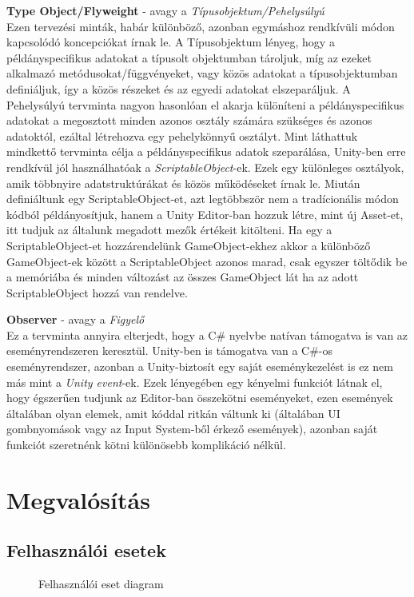 \textbf{Type Object/Flyweight} - avagy a \textit{Típusobjektum/Pehelysúlyú}\\
Ezen tervezési minták, habár különböző, azonban egymáshoz rendkívüli módon kapcsolódó koncepciókat írnak le. A Típusobjektum lényeg, hogy a példányspecifikus adatokat a típusolt objektumban tároljuk, míg az ezeket alkalmazó metódusokat/függvényeket, vagy közös adatokat a típusobjektumban definiáljuk, így a közös részeket és az egyedi adatokat elszeparáljuk. A Pehelysúlyú tervminta nagyon hasonlóan el akarja különíteni a példányspecifikus adatokat a megosztott minden azonos osztály számára szükséges és azonos adatoktól, ezáltal létrehozva egy pehelykönnyű osztályt. Mint láthattuk mindkettő tervminta célja a példányspecifikus adatok szeparálása, Unity-ben erre rendkívül jól használhatóak a \textit{ScriptableObject}-ek. Ezek egy különleges osztályok, amik többnyire adatstruktúrákat és közös működéseket írnak le. Miután definiáltunk egy ScriptableObject-et, azt legtöbbször nem a tradícionális módon kódból példányosítjuk, hanem a Unity Editor-ban hozzuk létre, mint új Asset-et, itt tudjuk az általunk megadott mezők értékeit kitölteni. Ha egy a ScriptableObject-et hozzárendelünk GameObject-ekhez akkor a különböző GameObject-ek között a ScriptableObject azonos marad, csak egyszer töltődik be a memóriába és minden változást az összes GameObject lát ha az adott ScriptableObject hozzá van rendelve.

\textbf{Observer} - avagy a \textit{Figyelő}\\
Ez a tervminta annyira elterjedt, hogy a C\# nyelvbe natívan támogatva is van az eseményrendszeren keresztül. Unity-ben is támogatva van a C\#-os eseményrendszer, azonban a Unity-biztosít egy saját eseménykezelést is ez nem más mint a \textit{Unity event}-ek. Ezek lényegében egy kényelmi funkciót látnak el, hogy égszerűen tudjunk az Editor-ban összekötni eseményeket, ezen események általában olyan elemek, amit kóddal ritkán váltunk ki (általában UI gombnyomások vagy az Input System-ből érkező események), azonban saját funkciót szeretnénk kötni különösebb komplikáció nélkül.


\cleardoublepage
\section{Megvalósítás}

\subsection{Felhasználói esetek}
\begin{figure}[H]
	\noindent{}
	\caption{Felhasználói eset diagram}
	\label{useCase}
\end{figure}

